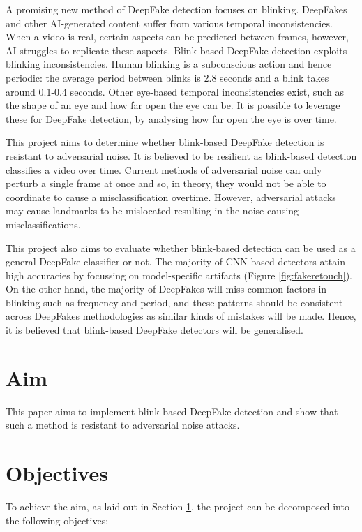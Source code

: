 A promising new method of DeepFake detection focuses on blinking. DeepFakes and other AI-generated content suffer from various temporal inconsistencies. When a video is real, certain aspects can be predicted between frames, however, AI struggles to replicate these aspects. Blink-based DeepFake detection exploits blinking inconsistencies. Human blinking is a subconscious action and hence periodic: the average period between blinks is 2.8 seconds and a blink takes around 0.1-0.4 seconds\cite{schiffman1990sensation}. Other eye-based temporal inconsistencies exist, such as the shape of an eye and how far open the eye can be. It is possible to leverage these for DeepFake detection, by analysing how far open the eye is over time.

This project aims to determine whether blink-based DeepFake detection is resistant to adversarial noise. It is believed to be resilient as blink-based detection classifies a video over time. Current methods of adversarial noise can only perturb a single frame at once and so, in theory, they would not be able to coordinate to cause a misclassification overtime. However, adversarial attacks may cause landmarks to be mislocated resulting in the noise causing misclassifications.

This project also aims to evaluate whether blink-based detection can be used as a general DeepFake classifier or not. The majority of CNN-based detectors attain high accuracies by focussing on model-specific artifacts (Figure \ref{fig:fakeretouch}). On the other hand, the majority of DeepFakes will miss common factors in blinking such as frequency and period, and these patterns should be consistent across DeepFakes methodologies as similar kinds of mistakes will be made. Hence, it is believed that blink-based DeepFake detectors will be generalised.

\section{Aim}
\label{sec:aim}

This paper aims to implement blink-based DeepFake detection and show that such a method is resistant to adversarial noise attacks.

\section{Objectives}
\label{sec:objectives}

To achieve the aim, as laid out in Section \ref{sec:aim}, the project can be decomposed into the following objectives:

